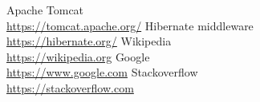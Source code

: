 \begin{thebibliography}{30}
     Apache Tomcat \\
        \url{https://tomcat.apache.org/}
     Hibernate middleware\\
        \url{https://hibernate.org/}
     Wikipedia\\
        \url{https://wikipedia.org}
     Google\\
        \url{https://www.google.com}
     Stackoverflow\\
        \url{https://stackoverflow.com}
\end{thebibliography}